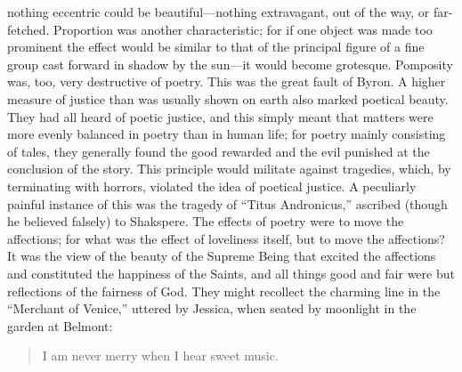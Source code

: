 nothing eccentric could be beautiful—nothing extravagant, out of the
way, or far-fetched. Proportion was another characteristic; for if one
object was made too prominent the effect would be similar to that of
the principal figure of a fine group cast forward in shadow by the
sun—it would become grotesque. Pomposity was, too, very destructive
of poetry. This was the great fault of Byron. A higher measure of
justice than was usually shown on earth also marked poetical beauty.
They had all heard of poetic justice, and this simply meant that
matters were more evenly balanced in poetry than in human life; for
poetry mainly consisting of tales, they generally found the good
rewarded and the evil punished at the conclusion of the story. This
principle would militate against tragedies, which, by terminating with
horrors, violated the idea of poetical justice. A peculiarly painful
instance of this was the tragedy of ``Titus Andronicus,'' ascribed
(though he believed falsely) to Shakspere. The effects of poetry were
to move the affections; for what was the effect of loveliness itself,
but to move the affections? It was the view of the beauty of the
Supreme Being that excited the affections and constituted the
happiness of the Saints, and all things good and fair were but
reflections of the fairness of God. They might recollect the charming
line in the ``Merchant of Venice,'' uttered by Jessica, when seated by
moonlight in the garden at Belmont:

\begin{quote}

I am never merry when I hear
sweet music.

\end{quote}

